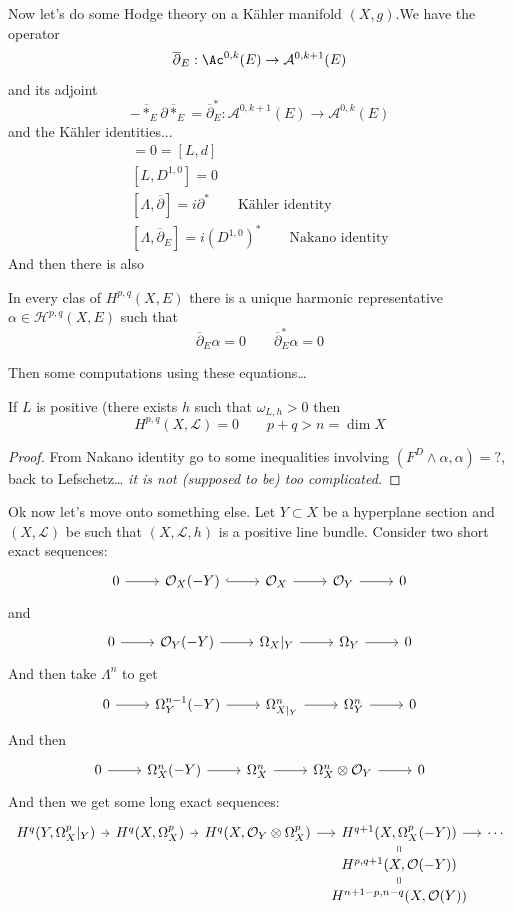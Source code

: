 Now let's do some Hodge theory on a K\"ahler manifold $(X,g)$.We have the operator
\[\overline{\partial}_E:\Ac^{0,k}(E)\to\mathcal{A}^{0,k+1}(E)\]
and its adjoint
\[-\overline{*}_E\partial\overline{*}_E=\overline{\partial}_E^*:\mathcal{A}^{0,k+1}(E)\to\mathcal{A}^{0,k}(E)\]
and the K\"ahler identities...
\begin{align*}
	[L,d]=0=[L,d]\\
	[L,D^{1,0}]=0\\
	[\Lambda,\overline{\partial}]=i\partial^*\qquad\text{K\"ahler identity} \\
	[\Lambda,\overline{\partial}_E]=i(D^{1,0})^*\qquad\text{Nakano identity}
\end{align*}
And then there is also
\begin{thm}
	In every clas of $H^{p,q}(X,E)$ there is a unique harmonic representative $\alpha\in \mathcal{H}^{p,q}(X,E)$ such that
	\[\overline{\partial}_E\alpha=0\qquad\overline{\partial}_E^*\alpha=0\]
\end{thm}
{\color{magenta}Then some computations using these equations…}

\begin{thm}
	If $L$ is positive (there exists $h$ such that $\omega_{L,h}>0$ then
	\[H^{p,q}(X,\mathcal{L})=0\qquad p+q>n=\dim X\]
\end{thm}
\begin{proof}
	From Nakano identity go to some inequalities involving $(F^D\wedge\alpha,\alpha)=?$, back to Lefschetz… \textit{it is not (supposed to be) too complicated.}
\end{proof}

Ok now let's move onto something else. Let $Y\subset X$ be a hyperplane section and $(X,\mathcal{L})$ be such that $(X,\mathcal{L},h)$ is a positive line bundle. Consider two short exact sequences:
\[\begin{tikzcd}
	0\arrow[r]&\mathcal{O}_X(-Y)\arrow[r,hook]&\mathcal{O}_X\arrow[r]&\mathcal{O}_Y\arrow[r]&0
\end{tikzcd}\]
and
\[\begin{tikzcd}
	0\arrow[r]&\mathcal{O}_Y(-Y)\arrow[r]&\Omega_X|_Y\arrow[r]&\Omega_Y\arrow[r]&0
\end{tikzcd}\]
And then take $\Lambda^n$ to get
\[\begin{tikzcd}
	0\arrow[r]&\Omega^{n-1}_Y(-Y)\arrow[r]&\Omega^n_{X|_Y}\arrow[r]&\Omega^n_Y\arrow[r]&0
\end{tikzcd}\]
And then
\[\begin{tikzcd}
	0\arrow[r]&\Omega^n_X(-Y)\arrow[r]&\Omega^n_X\arrow[r]&\Omega^n_X\otimes\mathcal{O}_Y\arrow[r]&0
\end{tikzcd}\]
And then we get some long exact sequences:
\[\begin{tikzcd}[column sep=tiny,row sep=tiny]
	H^{q}(Y,\Omega^p_X|_Y)\arrow[r]&H^{q}(X,\Omega^p_X)\arrow[r]&H^{q}(X,\mathcal{O}_Y\otimes\Omega^p_X)\arrow[r]&H^{q+1}(X,\Omega^p_X(-Y))\arrow[d,equals]\arrow[r]&\cdots\\
				       &&&H^{p,q+1}(X,\mathcal{O}(-Y))\arrow[d,equals]\\
				       &&&H^{n+1-p,n-q}(X,\mathcal{O}(Y))
\end{tikzcd}\]

